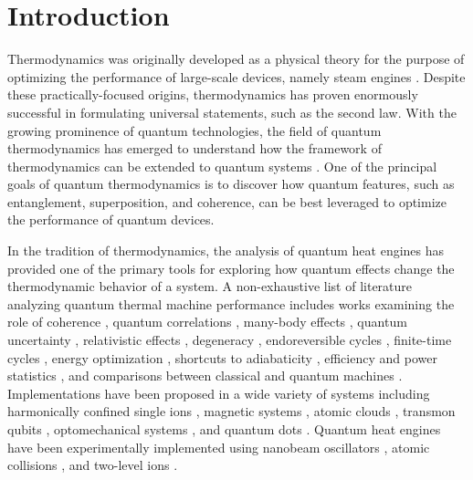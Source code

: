 \documentclass[preprints,article,accept,moreauthors,pdftex]{Definitions/mdpi}
\begin{document}
\section{Introduction}

Thermodynamics was originally developed as a physical theory for the purpose of optimizing the performance of large-scale devices, namely steam engines \cite{Kondepudi1998}. Despite these practically-focused origins, thermodynamics has proven enormously successful in formulating universal statements, such as the second law. With the growing prominence of quantum technologies, the field of quantum thermodynamics has emerged to understand how the framework of thermodynamics can be extended to quantum systems \cite{Deffner2019book}. One of the principal goals of quantum thermodynamics is to discover how quantum features, such as entanglement, superposition, and coherence, can be best leveraged to optimize the performance of quantum devices. 

In the tradition of thermodynamics, the analysis of quantum heat engines has provided one of the primary tools for exploring how quantum effects change the thermodynamic behavior of a system. A non-exhaustive list of literature analyzing quantum thermal machine performance includes works examining the role of coherence \cite{Scully2003, Scully2011, Uzdin2016, Watanabe2017, Dann2020, Feldmann2012, Hardal2015, Hammam2021}, quantum correlations \cite{Barrios2021}, many-body effects \cite{Hardal2015, Beau2016, Li2018, Chen2019, Watanabe2020}, quantum uncertainty \cite{Kerremans2021}, relativistic effects \cite{Munoz2012, Pena2016, Papadatos2021}, degeneracy \cite{Pena2017, Barrios2018}, endoreversible cycles \cite{Deffner2018, Smith2020, Myers2021}, finite-time cycles \cite{Cavina2017, Feldmann2012, Zheng2016, Raja2020}, energy optimization \cite{Singh2020}, shortcuts to adiabaticity \cite{Abah2017, Abah2018, Abah2019, Beau2016, Campo2014, Funo2019, Bonanca2019, Baris2019, Dann2020, Li2018}, efficiency and power statistics \cite{Denzler2020, Denzler20202, Denzler20203}, and comparisons between classical and quantum machines \cite{Quan2007, Gardas2015, Friedenberger2017, Deffner2018}. Implementations have been proposed in a wide variety of systems including harmonically confined single ions \cite{Abah2012}, magnetic systems \cite{Pena2015}, atomic clouds \cite{Niedenzu2019}, transmon qubits \cite{Cherubim2019}, optomechanical systems \cite{Zhang2014, Dechant2015}, and quantum dots \cite{Pena2019, Pena2020}. Quantum heat engines have been {experimentally} implemented using nanobeam oscillators \cite{Klaers2017}, atomic collisions \cite{Bouton2021}, and two-level ions \cite{Horne2020}.      
\end{document}
